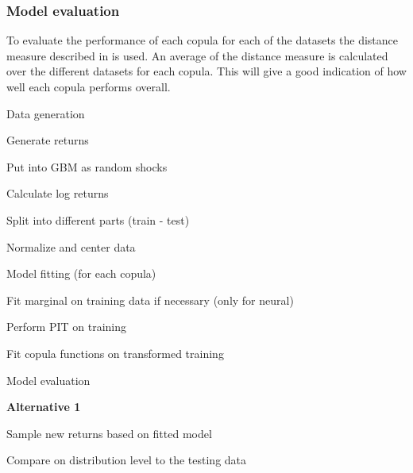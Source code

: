 \subsubsection{Model evaluation}
To evaluate the performance of each copula for each of the datasets the distance measure described in  is used. An average of the distance measure is calculated over the different datasets for each copula. This will give a good indication of how well each copula performs overall. 


\begin{generalinstructions}
    \begin{compactenum}
        \item Data generation
        \begin{compactenum}
            \item Generate returns
            \item Put into GBM as random shocks 
            \item Calculate log returns 
            \item Split into different parts (train - test)
            \item Normalize and center data
        \end{compactenum}
        \item Model fitting (for each copula)
        \begin{compactenum}
            \item Fit marginal on training data if necessary (only for neural) 
            \item Perform PIT on training
            \item Fit copula functions on transformed training
        \end{compactenum}
        \item Model evaluation
        
        \textbf{Alternative 1}
        \begin{compactenum}
            \item Sample new returns based on fitted model
            \item Compare on distribution level to the testing data
        \end{compactenum}
    \end{compactenum}
\end{generalinstructions}

